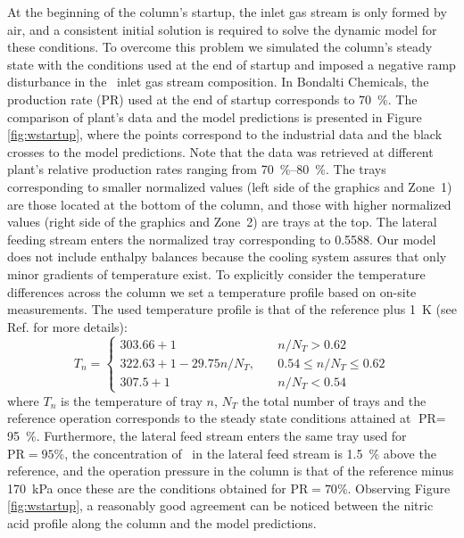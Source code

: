 \documentclass[journal=jacsat,manuscript=article]{achemso}
\newcommand{\nox}{\ce{NO_{\rmfamily{x}}}}
\newcommand{\hnotres}{\ce{HNO3}}
\begin{document}
At the beginning of the column's startup, the inlet gas stream is only formed by air, and a consistent initial solution is required to solve the dynamic model for these conditions. To overcome this problem we simulated the column's steady state with the conditions used at the end of startup and imposed a negative ramp disturbance in the \nox~inlet gas stream composition.
In Bondalti Chemicals, the production rate (PR) used at the end of startup corresponds to \SI{70}{\percent}.
The comparison of plant's data and the model predictions is presented in Figure \ref{fig:wstartup}, where the points correspond to the industrial data and the black crosses to the model predictions.
Note that the data was
retrieved at different plant's relative production rates ranging from \SIrange{70}{80}{\percent}. 
The trays corresponding to smaller normalized values (left
side of the graphics and Zone~1) are those located at the bottom of
the column, and those with higher normalized values (right side of the
graphics and Zone~2) are trays at the top. The lateral feeding
stream enters the normalized tray corresponding to 0.5588. 
Our model does not include enthalpy balances because the cooling system assures that only minor gradients of temperature exist. To explicitly consider the temperature differences across the column we set a temperature profile based on on-site measurements.
The used temperature profile is that of the reference plus \SI{1}{\kelvin} (see Ref.  for more details):
\begin{equation}
T_{n} = \begin{cases}
303.66 + 1 &  n/N_T>0.62\\
322.63+ 1 -29.75 n/N_T, \quad & 0.54 \leq n/N_T\leq 0.62 \\
307.5+ 1 & n/N_T < 0.54 
\end{cases}
\end{equation}
where $T_n$ is the temperature of tray $n$, $N_T$ the total number of trays and the reference operation corresponds to the steady state conditions attained at $\text{PR}=$\SI{95}{\percent}.
Furthermore, the
lateral feed stream enters the same tray used for $\text{PR}=95\%$,
the concentration of \hnotres~in the lateral feed stream
is \SI{1.5}{\percent} above the reference, and the operation pressure in
the column is that of the reference minus \SI{170}{\kilo\pascal} once these are the conditions obtained for $\text{PR}=70\%$.
Observing Figure \ref{fig:wstartup}, a reasonably good agreement can be noticed between the nitric acid
profile along the column and the model predictions. 
\end{document}
